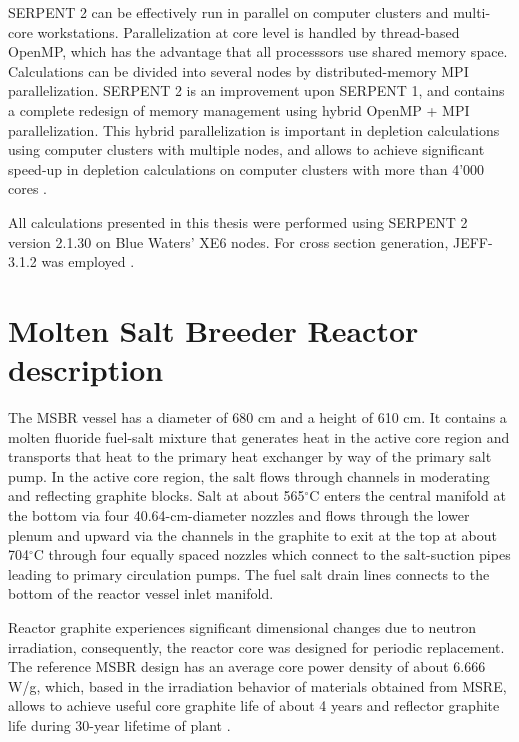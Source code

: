 SERPENT 2 can be effectively run in parallel on computer clusters and multi-core workstations. Parallelization at core level is handled by thread-based OpenMP, which has the advantage that all processsors use shared memory space. Calculations can be divided into several nodes by distributed-memory \gls{MPI} parallelization. SERPENT 2  is an improvement upon SERPENT 1, and contains a complete redesign of memory management using hybrid OpenMP \cite{dagum_openmp:_1998} + \gls{MPI} parallelization.  This hybrid parallelization is important in depletion calculations using computer clusters with multiple nodes, and allows to achieve significant speed-up in depletion calculations on computer clusters with more than 4'000 cores \cite{leppanen_serpent_2015-1}. 

All calculations presented in this thesis were performed using SERPENT 2 version 2.1.30 on Blue Waters’ XE6 nodes. For cross section generation, JEFF-3.1.2 was employed \cite{oecd/nea_data_bank_jeff-3.1.2_2014}. 

\section{Molten Salt Breeder Reactor description}

The \gls{MSBR} vessel has a diameter of 680 cm and a height of 610 cm. It contains a molten fluoride fuel-salt mixture that generates heat in the active core region and transports that heat to the primary heat exchanger by way of 
the primary salt pump. In the active core region, the salt flows through channels in moderating and reflecting graphite blocks. Salt at about 565$^{\circ}$C enters the central manifold at the bottom via four 40.64-cm-diameter nozzles and flows through the lower plenum and upward via the channels in the graphite to exit at the top at about 704$^{\circ}$C through four equally spaced nozzles which connect to the salt-suction pipes leading to primary circulation pumps. The fuel salt drain lines connects to the bottom of the reactor vessel inlet manifold.

Reactor graphite experiences significant dimensional changes due to neutron irradiation, consequently, the reactor core was designed for periodic replacement. The reference \gls{MSBR} design has an average core power density of about 6.666 W/g, which, based in the irradiation behavior of materials obtained from \gls{MSRE}, allows to achieve useful core graphite life of about 4 years and reflector graphite 	life during 30-year lifetime of plant \cite{robertson_conceptual_1971}.

